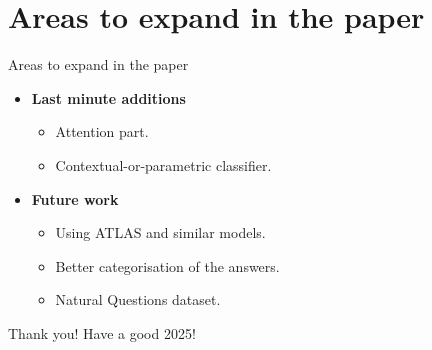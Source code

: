 \documentclass[9pt]{beamer}
\begin{document}
\section{Areas to expand in the paper}
\begin{frame}{Areas to expand in the paper}
	\begin{itemize}
		\item \textbf{Last minute additions}
			\begin{itemize}
				\item Attention part.
				\item Contextual-or-parametric classifier.
			\end{itemize}
		\item \textbf{Future work}
			\begin{itemize}
				\item Using ATLAS and similar models.
				\item Better categorisation of the answers.
				\item Natural Questions dataset.
			\end{itemize}
	\end{itemize}
\end{frame}

\begin{frame}{Thank you!}
	\centering
	\Huge
	Have a good 2025!
\end{frame}
\end{document}
